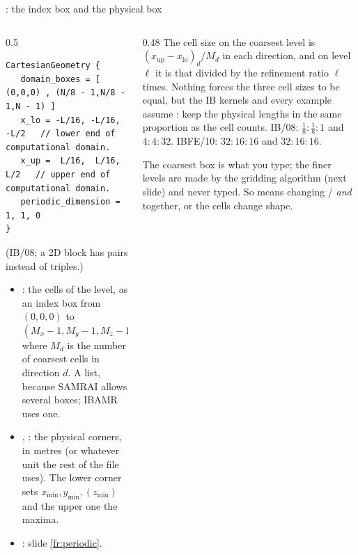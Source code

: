 \documentclass[aspectratio=169,11pt]{beamer}
\begin{document}
\begin{frame}[fragile]{: the index box and the physical box}
\label{fr:geom}
\begin{columns}[T,onlytextwidth]
\begin{column}{0.5\textwidth}
\begin{lstlisting}[style=inputtiny]
CartesianGeometry {
   domain_boxes = [ (0,0,0) , (N/8 - 1,N/8 - 1,N - 1) ]
   x_lo = -L/16, -L/16, -L/2   // lower end of computational domain.
   x_up =  L/16,  L/16,  L/2   // upper end of computational domain.
   periodic_dimension = 1, 1, 0
}
\end{lstlisting}
\footnotesize (IB/08; a 2D block has pairs instead of triples.)
\begin{itemize}
  \item {}: the cells of the  level, as an index box from $(0,0,0)$ to $(M_x - 1, M_y - 1, M_z - 1)$ where $M_d$ is the number of coarsest cells in direction $d$. A list, because SAMRAI allows several boxes; IBAMR uses one.
  \item {}, : the physical corners, in metres (or whatever unit the rest of the file uses). The lower corner sets $x_{\min}, y_{\min}, (z_{\min})$ and the upper one the maxima.
  \item {}: slide \ref{fr:periodic}.
\end{itemize}
\end{column}
\begin{column}{0.48\textwidth}
\footnotesize The cell size on the coarsest level is $(x_{\mathrm{up}} - x_{\mathrm{lo}})_d / M_d$ in each direction, and on level $\ell$ it is that divided by the refinement ratio $\ell$ times. Nothing forces the three cell sizes to be equal, but the IB kernels and every example assume : keep the physical lengths in the same proportion as the cell counts. IB/08: $\frac{1}{8} : \frac{1}{8} : 1$ and $4 : 4 : 32$. IBFE/10: $32 : 16 : 16$ and $32 : 16 : 16$.
\vspace{1mm}

\footnotesize The coarsest box is what you type; the finer levels are made by the gridding algorithm (next slide) and never typed. So  means changing / \emph{and}  together, or the cells change shape.
\end{column}
\end{columns}
\end{frame}
\end{document}
